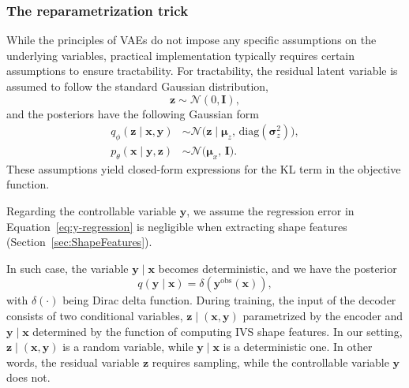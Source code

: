 \documentclass{article}
\begin{document}
\subsubsection{The reparametrization trick}
While the principles of VAEs do not impose any specific assumptions on the underlying variables, practical implementation typically requires certain assumptions to ensure tractability. For tractability, the residual latent variable is assumed to follow the standard Gaussian distribution,  
\begin{equation}\label{eq:prior}
\mathbf{z} \sim \mathcal{N}(0, \mathbf{I}),
\end{equation}
and the posteriors have the following Gaussian form  
\begin{subequations}\label{eq:posterior}
    \begin{align}
        q_{\phi}(\mathbf{z} \mid \mathbf{x}, \mathbf{y}) &\sim \mathcal{N} \big(\mathbf{z} \mid \boldsymbol{\mu}_{z},\, \mathrm{diag}(\boldsymbol{\sigma}^2_{z}) \big),\\
        p_{\theta}(\mathbf{x} \mid \mathbf{y, z}) &\sim \mathcal{N}\big(\boldsymbol{\mu}_{x},\, \mathbf{I}\big).
    \end{align}
\end{subequations}
These assumptions yield closed-form expressions for the KL term in the objective function. 

Regarding the controllable variable $\mathbf{y}$, we assume the regression error in Equation~\eqref{eq:y-regression} is negligible when extracting shape features  (Section~\ref{sec:ShapeFeatures}). 

In such case, the variable $\mathbf{y} \mid \mathbf{x}$ becomes deterministic, and we have the posterior
\begin{equation} \label{eq:yonx}
q(\mathbf{y} \mid \mathbf{x}) = \delta(\mathbf{y}^{\text{obs}}(\mathbf{x})),
\end{equation}
with  $\delta(\cdot)$ being Dirac delta function.
During training,  the input of the decoder consists of two conditional variables, $\mathbf{z} \mid (\mathbf{x},\mathbf{y}) $ parametrized by the encoder and $\mathbf{y} \mid \mathbf{x} $ determined by the function of computing  IVS shape features.  In  our setting, $\mathbf{z} \mid (\mathbf{x},\mathbf{y}) $ is a random variable,  while $\mathbf{y} \mid \mathbf{x} $ is a deterministic one. In other words,  the residual variable $\mathbf{z}$ requires sampling, while the controllable variable $\mathbf{y}$ does not.
\end{document}
